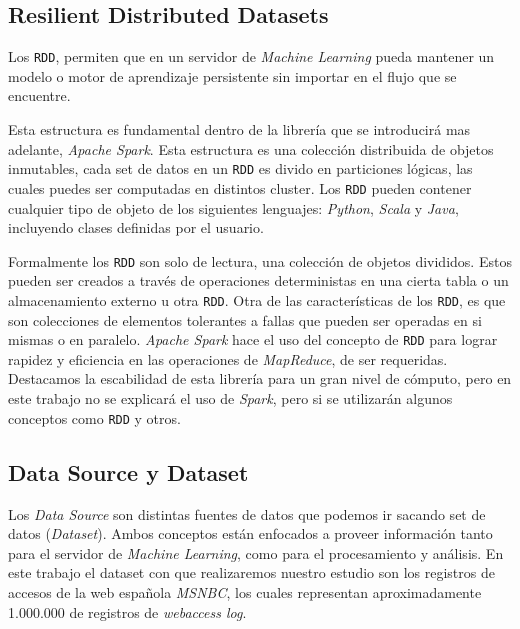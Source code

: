  


\subsection{Resilient Distributed Datasets }\label{concept-RDD}

	Los \texttt{RDD}, permiten que en un servidor de \emph{Machine Learning } pueda mantener un modelo o motor de aprendizaje persistente sin importar en el flujo que se encuentre.

	Esta estructura es fundamental dentro de la librería que se introducirá mas adelante, \emph{Apache Spark}. Esta estructura es una colección distribuida de objetos inmutables, cada 
	set de datos en un \texttt{RDD} es divido en particiones lógicas, las cuales puedes ser computadas en distintos cluster. Los \texttt{RDD} pueden contener cualquier tipo de objeto de los siguientes lenguajes: \emph{Python}, \emph{Scala} y \emph{Java}, incluyendo clases definidas por el usuario. 

	Formalmente los \texttt{RDD} son solo de lectura, una colección de objetos divididos. Estos pueden ser creados a través de  operaciones deterministas en una cierta tabla o un almacenamiento externo u otra \texttt{RDD}.
	Otra de las características de los \texttt{RDD}, es que son colecciones de elementos tolerantes a fallas que pueden ser operadas en si mismas o en paralelo.
	\emph{Apache Spark} hace el uso del concepto de \texttt{RDD} para lograr rapidez y eficiencia en las operaciones de \emph{MapReduce}, de ser requeridas. Destacamos la escabilidad de esta librería para un gran nivel de cómputo, pero en este trabajo no se explicará el uso de \emph{Spark}, pero si se utilizarán algunos conceptos como \texttt{RDD} y otros.




\subsection{Data Source y Dataset }

	Los \emph{Data Source} son distintas fuentes de datos que podemos ir sacando set de datos (\emph{Dataset}). Ambos conceptos están enfocados a proveer información tanto para el servidor de \emph{Machine Learning}, como para el procesamiento y análisis.
	En este trabajo el dataset con que realizaremos nuestro estudio son los registros de accesos de la web española \emph{MSNBC}\cite{Claude2014}, los cuales representan aproximadamente 1.000.000 de registros de \emph{webaccess log}.

